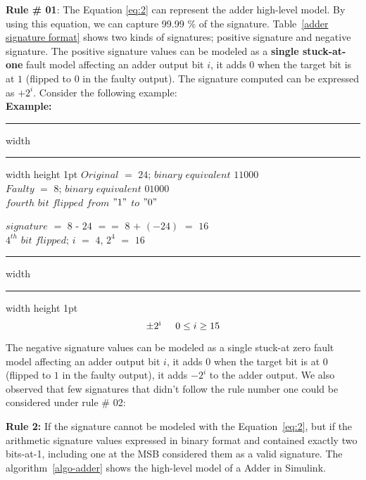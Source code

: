 \textbf{Rule \# 01}: The Equation \ref{eq:2} can represent the adder high-level model. By using this equation, we can capture 99.99 \% of the signature. Table~\ref{adder signature format} shows two kinds of signatures; positive signature and negative signature. 
The positive signature values can be modeled as a \textbf{single stuck-at-one} fault model affecting an adder output bit $i$,  it adds $0$ when the target bit is at $1$ (flipped to $0$ in the faulty output). The signature computed can be expressed as $+2^{i}$. Consider the following example: \\
\vspace{ 0.1 cm}
\hspace{-0.3 cm}\textbf{Example:}
\hrule height 2pt width \hsize \kern 1pt \hrule width \hsize height 1pt
\vspace{0.2 cm}
$Original$ $=$ $24$; $binary $ $ equivalent$ $11000$ \\
\hspace{-0.15cm} $Faulty$ $=$ $8$; $binary $ $ equivalent$ $01000$ \\
$fourth$ $bit$ $flipped$ $from$ $"1"$ $to$ $"0"$

$signature$ $=$ $8$ - $24$ $==$ $8$ $+$ $(-24)$ $=$ $16$ \\
$4^{th}$ $ bit $ $flipped$; $i$  $=$ $4$, $2^{4}$ $=$ $16$
\vspace{0.01cm}
\hrule height 2pt width \hsize \kern 1pt \hrule width \hsize height 1pt
\vspace{0.25 cm}
\textit{\begin{equation}
\label{eq:2}
  \pm2\textsuperscript{i}    \hspace{0.5 cm} 0\leq i \geq15
\end{equation}}









The negative signature values can be modeled as a single stuck-at zero fault model affecting an adder output bit $i$, it adds $0$ when the target bit is at $0$ (flipped to $1$ in the faulty output), it adds $-2^i$ to the adder output. 
We also observed that few signatures that didn't follow the rule number one could be considered under rule \# 02: 


\textbf{Rule 2:} If the signature cannot be modeled with the Equation~\ref{eq:2}, but if the arithmetic signature values expressed in binary format and contained exactly two bits-at-1, including one at the MSB considered them as a valid signature. The algorithm~\ref{algo-adder} shows the high-level model of a Adder in Simulink.


